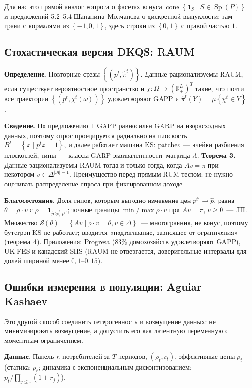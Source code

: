 \documentclass[a4paper,11pt]{article}
\theoremstyle{plain}
\theoremstyle{definition}
\theoremstyle{remark}
\newcommand{\R}{\mathbb{R}}
\newcommand{\set}[1]{\left\{ #1 \right\}}
\newcommand{\Rp}[1][2]{\R^{#1}_{+}}   %
\DeclareMathOperator{\cone}{cone}
\DeclareMathOperator{\Sp}{Sp}
\begin{document}
Для нас это прямой аналог вопроса о фасетах конуса $\cone\set{\mathbf 1_S\mid S\in\Sp(P)}$ и предложений 5.2--5.4 Шананина--Молчанова о дискретной выпуклости: там грани с нормалями из $\set{-1,0,1}$, здесь строки из $\set{0,1}$ с правой частью $1$.

\subsection{Стохастическая версия DKQS: RAUM}

\textbf{Определение.} Повторные срезы $\set{(p^t,\hat\pi^t)}$. Данные рационализуемы RAUM, если существует вероятностное пространство и $\chi:\Omega\to(\Rp[L])^T$ такие, что почти все траектории $\set{(p^t,\chi^t(\omega))}$ удовлетворяют GAPP и $\hat\pi^t(Y)=\mu\set{\chi^t\in Y}$.

\textbf{Сведение.} По предложению~1 GAPP равносилен GARP на изорасходных данных, поэтому спрос проецируется радиально на плоскость $B^t=\set{x\mid p^tx=1}$, и далее работает машина KS: patches~--- ячейки разбиения плоскостей, типы~--- классы GARP-эквивалентности, матрица $A$. \textbf{Теорема 3.} Данные рационализуемы RAUM тогда и только тогда, когда $Av=\pi$ при некотором $v\in\Delta^{|\mathcal A|-1}$. Преимущество перед прямым RUM-тестом: не нужно оценивать распределение спроса при фиксированном доходе.

\textbf{Благосостояние.} Доля типов, которым выгодно изменение цен $p^{t'}\to\hat p$, равна $\theta=\rho\cdot v$ с $\rho=\mathbf 1_{\hat p\succeq_p^*p^{t'}}$; точные границы $\min/\max\rho\cdot v$ при $Av=\pi$, $v\ge0$~--- ЛП. Множество $\mathcal S(\theta)=\set{Av\mid\rho\cdot v=\theta,v\in\Delta}$~--- многогранник, не конус, поэтому бутстрэп KS не работает; вводится «подтягивание, зависящее от ограничения» (теорема~4). Приложения: Progresa (83\% домохозяйств удовлетворяют GAPP), UK FES и канадский SHS (RAUM не отвергается, доверительные интервалы для долей шириной менее $0{,}1$--$0{,}15$).

\subsection{Ошибки измерения в популяции: Aguiar--Kashaev}

Это другой способ соединить гетерогенность и возмущение данных: не минимизировать возмущение, а допустить его как латентную переменную с моментным ограничением.

\textbf{Данные.} Панель $n$ потребителей за $T$ периодов, $(\rho_t,c_t)$, эффективные цены $\rho_t$ (статика: $p_t$; динамика с экспоненциальным дисконтированием: $p_t/\prod_{j\le t}(1+r_j)$).
\end{document}
